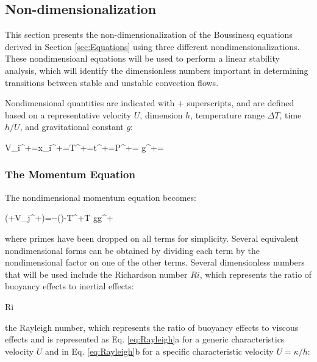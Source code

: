\documentclass[10pt]{article}
\numberwithin{equation}{section} %
\begin{document}
\subsection{Non-dimensionalization}

This section presents the non-dimensionalization of the Boussinesq equations derived in Section \ref{sec:Equations} using three different nondimensionalizations. These nondimensioanl equations will be used to perform a linear stability analysis, which will identify the dimensionless numbers important in determining transitions between stable and unstable convection flows. 

Nondimensional quantities are indicated with \(+\) superscripts, and are defined based on a representative velocity \(U\), dimension \(h\), temperature range \(\Delta T\), time \(h/U\), and gravitational constant \(g\):

\beq
\label{eq:NonDims}
V_i^+=\hspace{1cm}x_i^+=\hspace{1cm}T^+=\hspace{1cm}t^+=\hspace{1cm}P^+=\hspace{1cm} g^+=
\eeq

\subsubsection{The Momentum Equation}

The nondimensional momentum equation becomes:

\beq
\label{eq:NondimMom}
\left(+V_j^+\right)=--\nu{}\left(\right)-\beta T^+\Delta T gg^+
\eeq

where primes have been dropped on all terms for simplicity. Several equivalent nondimensional forms can be obtained by dividing each term by the nondimensional factor on one of the other terms. Several dimensionless numbers that will be used include the Richardson number \(Ri\), which represents the ratio of buoyancy effects to inertial effects:

\beq
Ri\equiv{}
\eeq

the Rayleigh number, which represents the ratio of buoyancy effects to viscous effects and is represented as Eq. \eqref{eq:Rayleigh}a for a generic characteristics velocity \(U\) and in Eq. \eqref{eq:Rayleigh}b for a specific characteristic velocity \(U=\kappa/h\):
\end{document}
